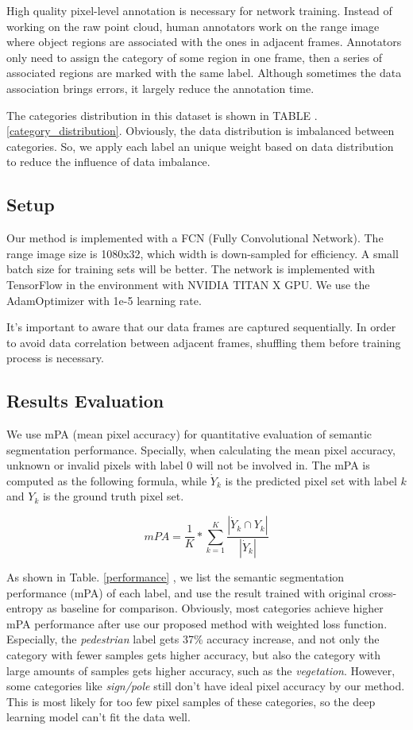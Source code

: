 High quality pixel-level annotation is necessary for network training. Instead of working on the raw point cloud, human annotators work on the range image where object regions are associated with the ones in adjacent frames. Annotators only need to assign the category of some region in one frame, then a series of associated regions are marked with the same label. Although sometimes the data association brings errors, it largely reduce the annotation time. 

The categories distribution in this dataset is shown in TABLE . \ref{category_distribution}. Obviously, the data distribution is imbalanced between categories. So, we apply each label an unique weight based on data distribution to reduce the influence of data imbalance.

\subsection{Setup}
Our method is implemented with a FCN (Fully Convolutional Network). The range image size is 1080x32, which width is down-sampled for efficiency. A small batch size for training sets will be better. The network is implemented with TensorFlow in the environment with NVIDIA TITAN X GPU. We use the AdamOptimizer with 1e-5 learning rate.

It's important to aware that our data frames are captured sequentially. In order to avoid data correlation between adjacent frames, shuffling them before training process is necessary.

\subsection{Results Evaluation}
We use mPA (mean pixel accuracy) for quantitative evaluation of semantic segmentation performance. Specially, when calculating the mean pixel accuracy, unknown or invalid pixels with label 0 will not be involved in. The mPA is computed as the following formula, while $\dot{Y}_k$ is the predicted pixel set with label $k$ and $Y_k$ is the ground truth pixel set.

\begin{equation}
mPA = \dfrac{1}{K}*\sum_{k=1}^{K}\dfrac{\left| \dot{Y}_k \cap Y_k \right|}{\left| \dot{Y}_k\right|}
\end{equation}

As shown in Table. \ref{performance} , we list the semantic segmentation performance (mPA) of each label, and use the result trained with original cross-entropy as baseline for comparison. Obviously, most categories achieve higher mPA performance after use our proposed method with weighted loss function. Especially, the \textit{pedestrian} label gets 37\% accuracy increase, and not only the category with fewer samples gets higher accuracy, but also the category with large amounts of samples gets higher accuracy, such as the \textit{vegetation}. However, some categories like \textit{sign/pole} still don't have ideal pixel accuracy by our method. This is most likely for too few pixel samples of these categories, so the deep learning model can't fit the data well.

